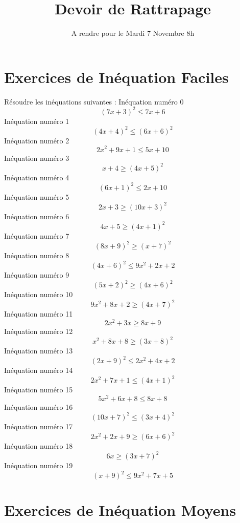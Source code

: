 \documentclass{article}
\title{Devoir de Rattrapage}
\date{A rendre pour le Mardi 7 Novembre 8h}\usepackage{natbib}
\begin{document}
\maketitle
 \section{Exercices de In\'equation Faciles}

 R\'esoudre les in\'equations suivantes : 
In\'equation num\'ero 0 \[\left(7 x + 3\right)^{2} \leq 7 x + 6\]In\'equation num\'ero 1 \[\left(4 x + 4\right)^{2} \leq \left(6 x + 6\right)^{2}\]In\'equation num\'ero 2 \[2 x^{2} + 9 x + 1 \leq 5 x + 10\]In\'equation num\'ero 3 \[x + 4 \geq \left(4 x + 5\right)^{2}\]In\'equation num\'ero 4 \[\left(6 x + 1\right)^{2} \leq 2 x + 10\]In\'equation num\'ero 5 \[2 x + 3 \geq \left(10 x + 3\right)^{2}\]In\'equation num\'ero 6 \[4 x + 5 \geq \left(4 x + 1\right)^{2}\]In\'equation num\'ero 7 \[\left(8 x + 9\right)^{2} \geq \left(x + 7\right)^{2}\]In\'equation num\'ero 8 \[\left(4 x + 6\right)^{2} \leq 9 x^{2} + 2 x + 2\]In\'equation num\'ero 9 \[\left(5 x + 2\right)^{2} \geq \left(4 x + 6\right)^{2}\]In\'equation num\'ero 10 \[9 x^{2} + 8 x + 2 \geq \left(4 x + 7\right)^{2}\]In\'equation num\'ero 11 \[2 x^{2} + 3 x \geq 8 x + 9\]In\'equation num\'ero 12 \[x^{2} + 8 x + 8 \geq \left(3 x + 8\right)^{2}\]In\'equation num\'ero 13 \[\left(2 x + 9\right)^{2} \leq 2 x^{2} + 4 x + 2\]In\'equation num\'ero 14 \[2 x^{2} + 7 x + 1 \leq \left(4 x + 1\right)^{2}\]In\'equation num\'ero 15 \[5 x^{2} + 6 x + 8 \leq 8 x + 8\]In\'equation num\'ero 16 \[\left(10 x + 7\right)^{2} \leq \left(3 x + 4\right)^{2}\]In\'equation num\'ero 17 \[2 x^{2} + 2 x + 9 \geq \left(6 x + 6\right)^{2}\]In\'equation num\'ero 18 \[6 x \geq \left(3 x + 7\right)^{2}\]In\'equation num\'ero 19 \[\left(x + 9\right)^{2} \leq 9 x^{2} + 7 x + 5\]
 \section{Exercices de In\'equation Moyens}
\end{document}
